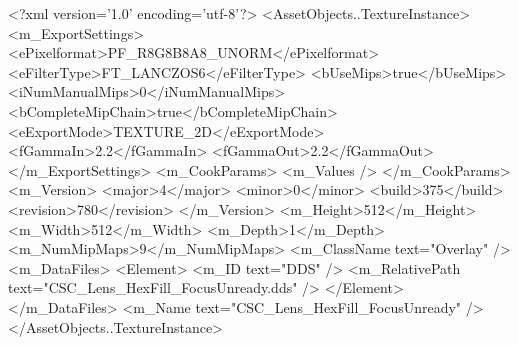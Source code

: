 <?xml version='1.0' encoding='utf-8'?>
<AssetObjects..TextureInstance>
  <m_ExportSettings>
    <ePixelformat>PF_R8G8B8A8_UNORM</ePixelformat>
    <eFilterType>FT_LANCZOS6</eFilterType>
    <bUseMips>true</bUseMips>
    <iNumManualMips>0</iNumManualMips>
    <bCompleteMipChain>true</bCompleteMipChain>
    <eExportMode>TEXTURE_2D</eExportMode>
    <fGammaIn>2.2</fGammaIn>
    <fGammaOut>2.2</fGammaOut>
  </m_ExportSettings>
  <m_CookParams>
    <m_Values />
  </m_CookParams>
  <m_Version>
    <major>4</major>
    <minor>0</minor>
    <build>375</build>
    <revision>780</revision>
  </m_Version>
  <m_Height>512</m_Height>
  <m_Width>512</m_Width>
  <m_Depth>1</m_Depth>
  <m_NumMipMaps>9</m_NumMipMaps>
  <m_ClassName text="Overlay" />
  <m_DataFiles>
    <Element>
      <m_ID text="DDS" />
      <m_RelativePath text="CSC_Lens_HexFill_FocusUnready.dds" />
    </Element>
  </m_DataFiles>
  <m_Name text="CSC_Lens_HexFill_FocusUnready" />
</AssetObjects..TextureInstance>
